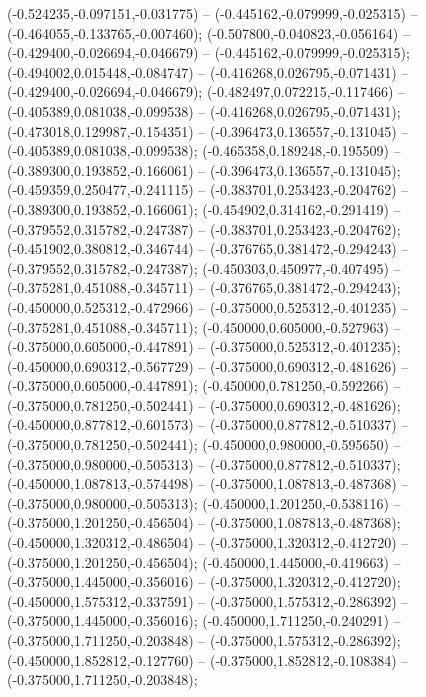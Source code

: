  (-0.524235,-0.097151,-0.031775) -- (-0.445162,-0.079999,-0.025315) -- (-0.464055,-0.133765,-0.007460);
 (-0.507800,-0.040823,-0.056164) -- (-0.429400,-0.026694,-0.046679) -- (-0.445162,-0.079999,-0.025315);
 (-0.494002,0.015448,-0.084747) -- (-0.416268,0.026795,-0.071431) -- (-0.429400,-0.026694,-0.046679);
 (-0.482497,0.072215,-0.117466) -- (-0.405389,0.081038,-0.099538) -- (-0.416268,0.026795,-0.071431);
 (-0.473018,0.129987,-0.154351) -- (-0.396473,0.136557,-0.131045) -- (-0.405389,0.081038,-0.099538);
 (-0.465358,0.189248,-0.195509) -- (-0.389300,0.193852,-0.166061) -- (-0.396473,0.136557,-0.131045);
 (-0.459359,0.250477,-0.241115) -- (-0.383701,0.253423,-0.204762) -- (-0.389300,0.193852,-0.166061);
 (-0.454902,0.314162,-0.291419) -- (-0.379552,0.315782,-0.247387) -- (-0.383701,0.253423,-0.204762);
 (-0.451902,0.380812,-0.346744) -- (-0.376765,0.381472,-0.294243) -- (-0.379552,0.315782,-0.247387);
 (-0.450303,0.450977,-0.407495) -- (-0.375281,0.451088,-0.345711) -- (-0.376765,0.381472,-0.294243);
 (-0.450000,0.525312,-0.472966) -- (-0.375000,0.525312,-0.401235) -- (-0.375281,0.451088,-0.345711);
 (-0.450000,0.605000,-0.527963) -- (-0.375000,0.605000,-0.447891) -- (-0.375000,0.525312,-0.401235);
 (-0.450000,0.690312,-0.567729) -- (-0.375000,0.690312,-0.481626) -- (-0.375000,0.605000,-0.447891);
 (-0.450000,0.781250,-0.592266) -- (-0.375000,0.781250,-0.502441) -- (-0.375000,0.690312,-0.481626);
 (-0.450000,0.877812,-0.601573) -- (-0.375000,0.877812,-0.510337) -- (-0.375000,0.781250,-0.502441);
 (-0.450000,0.980000,-0.595650) -- (-0.375000,0.980000,-0.505313) -- (-0.375000,0.877812,-0.510337);
 (-0.450000,1.087813,-0.574498) -- (-0.375000,1.087813,-0.487368) -- (-0.375000,0.980000,-0.505313);
 (-0.450000,1.201250,-0.538116) -- (-0.375000,1.201250,-0.456504) -- (-0.375000,1.087813,-0.487368);
 (-0.450000,1.320312,-0.486504) -- (-0.375000,1.320312,-0.412720) -- (-0.375000,1.201250,-0.456504);
 (-0.450000,1.445000,-0.419663) -- (-0.375000,1.445000,-0.356016) -- (-0.375000,1.320312,-0.412720);
 (-0.450000,1.575312,-0.337591) -- (-0.375000,1.575312,-0.286392) -- (-0.375000,1.445000,-0.356016);
 (-0.450000,1.711250,-0.240291) -- (-0.375000,1.711250,-0.203848) -- (-0.375000,1.575312,-0.286392);
 (-0.450000,1.852812,-0.127760) -- (-0.375000,1.852812,-0.108384) -- (-0.375000,1.711250,-0.203848);
